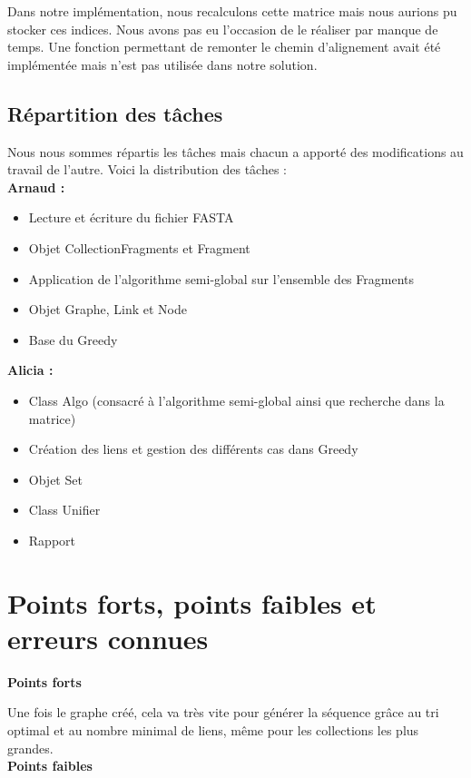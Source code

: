 \documentclass{article}
\begin{document}
Dans notre implémentation, nous recalculons cette matrice mais nous aurions pu stocker ces indices. Nous avons pas eu l'occasion de le réaliser par manque de temps. Une fonction permettant de remonter le chemin d'alignement avait été implémentée mais n'est pas utilisée dans notre solution.


\subsection{Répartition des tâches}
Nous nous sommes répartis les tâches mais chacun a apporté des modifications au travail de l'autre. Voici la distribution des tâches :\\

\textbf{Arnaud :}
\begin{itemize}
\item Lecture et écriture du fichier FASTA
\item Objet CollectionFragments et Fragment
\item Application de l'algorithme semi-global sur l'ensemble des Fragments
\item Objet Graphe, Link et Node
\item Base du Greedy
\end{itemize}

\vspace{1.5mm}
\textbf{Alicia :}
\begin{itemize}
\item Class Algo (consacré à l'algorithme semi-global ainsi que recherche dans la matrice)
\item Création des liens et gestion des différents cas dans Greedy
\item Objet Set
\item Class Unifier
\item Rapport
\end{itemize}
\section{Points forts, points faibles et erreurs connues}
\textbf{Points forts}
\vspace{1.5mm}

Une fois le graphe créé, cela va très vite pour générer la séquence grâce au tri optimal et au nombre minimal de liens, même pour les collections les plus grandes.\\

\textbf{Points faibles}
\vspace{1.5mm}
\end{document}
